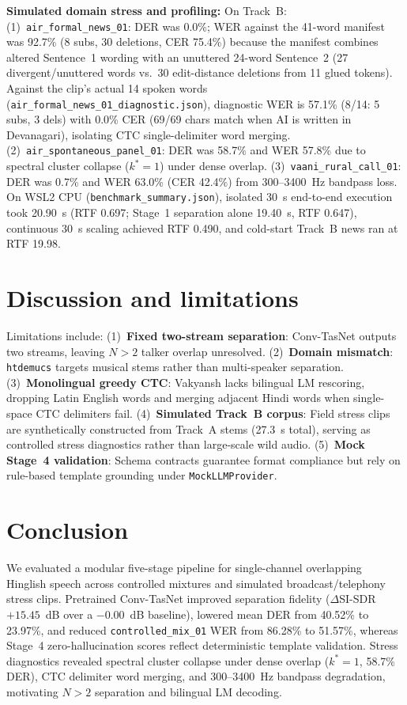 \documentclass[11pt,a4paper,twocolumn]{article}
\begin{document}
\noindent\textbf{Simulated domain stress and profiling:} On Track~B: (1)~\texttt{air\_formal\_news\_01}: DER was 0.0\%; WER against the 41-word manifest was 92.7\% (8 subs, 30 deletions, CER 75.4\%) because the manifest combines altered Sentence~1 wording with an unuttered 24-word Sentence~2 (27 divergent/unuttered words vs.\ 30 edit-distance deletions from 11 glued tokens). Against the clip's actual 14 spoken words (\texttt{air\_formal\_news\_01\_diagnostic.json}), diagnostic WER is 57.1\% (8/14: 5 subs, 3 dels) with 0.0\% CER (69/69 chars match when AI is written in Devanagari), isolating CTC single-delimiter word merging. (2)~\texttt{air\_spontaneous\_panel\_01}: DER was 58.7\% and WER 57.8\% due to spectral cluster collapse ($k^* = 1$) under dense overlap. (3)~\texttt{vaani\_rural\_call\_01}: DER was 0.7\% and WER 63.0\% (CER 42.4\%) from 300--3400~Hz bandpass loss. On WSL2 CPU (\texttt{benchmark\_summary.json}), isolated 30~s end-to-end execution took 20.90~s (RTF 0.697; Stage~1 separation alone 19.40~s, RTF 0.647), continuous 30~s scaling achieved RTF 0.490, and cold-start Track~B news ran at RTF 19.98.

\section{Discussion and limitations}
Limitations include: (1)~\textbf{Fixed two-stream separation}: Conv-TasNet outputs two streams, leaving $N > 2$ talker overlap unresolved. (2)~\textbf{Domain mismatch}: \texttt{htdemucs} targets musical stems rather than multi-speaker separation. (3)~\textbf{Monolingual greedy CTC}: Vakyansh lacks bilingual LM rescoring, dropping Latin English words and merging adjacent Hindi words when single-space CTC delimiters fail. (4)~\textbf{Simulated Track~B corpus}: Field stress clips are synthetically constructed from Track~A stems (27.3~s total), serving as controlled stress diagnostics rather than large-scale wild audio. (5)~\textbf{Mock Stage~4 validation}: Schema contracts guarantee format compliance but rely on rule-based template grounding under \texttt{MockLLMProvider}.

\section{Conclusion}
We evaluated a modular five-stage pipeline for single-channel overlapping Hinglish speech across controlled mixtures and simulated broadcast/telephony stress clips. Pretrained Conv-TasNet improved separation fidelity ($\Delta$SI-SDR $+15.45$~dB over a $-0.00$~dB baseline), lowered mean DER from 40.52\% to 23.97\%, and reduced \texttt{controlled\_mix\_01} WER from 86.28\% to 51.57\%, whereas Stage~4 zero-hallucination scores reflect deterministic template validation. Stress diagnostics revealed spectral cluster collapse under dense overlap ($k^*=1$, 58.7\% DER), CTC delimiter word merging, and 300--3400~Hz bandpass degradation, motivating $N>2$ separation and bilingual LM decoding.
\end{document}
